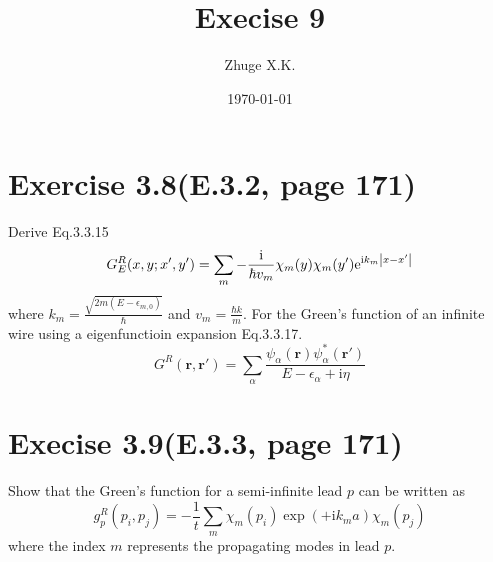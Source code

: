\documentclass[11pt,a4paper]{article}
\title{Execise 9}
\author{Zhuge X.K.}
\date{\today}
\theoremstyle{plain}
\theoremstyle{definition}
\theoremstyle{remark}
\newcommand{\ii}{\mathrm{i}}                      %
\newcommand{\eexp}{\mathrm{e}}                    %
\renewcommand{\vec}[1]{\boldsymbol{#1}}
\begin{document}
\maketitle
\section*{Exercise 3.8(E.3.2, page 171)}
Derive Eq.3.3.15 
\begin{equation*}
    G^R_E(x,y;x',y') = \sum_m -\frac{\ii}{\hbar v_m} \chi_m(y)\chi_m(y') \eexp^{\ii k_m \abs{x-x'}}
\end{equation*}
where $k_m = \frac{\sqrt{2m(E-\epsilon_{m,0})}}{\hbar}$ and $v_m = \frac{\hbar k}{m}$. For the Green's function of an infinite wire using a eigenfunctioin expansion Eq.3.3.17.
\begin{equation*}
    G^R(\vec{r},\vec{r}') = \sum_\alpha \frac{\psi_\alpha(\vec{r})\psi_\alpha^*(\vec{r}')}{E - \epsilon_\alpha + \ii \eta}
\end{equation*}

\section*{Execise 3.9(E.3.3, page 171)}
Show that the Green's function for a semi-infinite lead $p$ can be written as
\begin{equation*}
    g^R_p(p_i,p_j) = -\frac{1}{t} \sum_m \chi_m(p_i)\exp(+\ii k_m a)\chi_m (p_j)
\end{equation*}
where the index $m$ represents the propagating modes in lead $p$.
\end{document}
